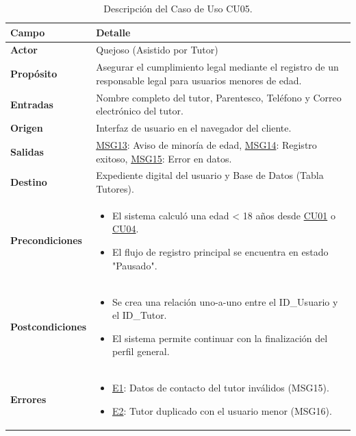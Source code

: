\begin{appendices}
\begin{table}[htbp]
\centering
\small
\begin{tabular}{|p{3.5cm}|p{10.5cm}|}
\hline
\rowcolor[HTML]{EFEFEF} 
\textbf{Campo} & \textbf{Detalle} \\ \hline
\textbf{Actor} & Quejoso (Asistido por Tutor) \\ \hline
\textbf{Propósito} & Asegurar el cumplimiento legal mediante el registro de un responsable legal para usuarios menores de edad. \\ \hline
\textbf{Entradas} & Nombre completo del tutor, Parentesco, Teléfono y Correo electrónico del tutor. \\ \hline
\textbf{Origen} & Interfaz de usuario en el navegador del cliente. \\ \hline
\textbf{Salidas} & \hyperlink{msg:MSG13}{MSG13}: Aviso de minoría de edad, \hyperlink{msg:MSG14}{MSG14}: Registro exitoso, \hyperlink{msg:MSG15}{MSG15}: Error en datos. \\ \hline
\textbf{Destino} & Expediente digital del usuario y Base de Datos (Tabla Tutores). \\ \hline
\textbf{Precondiciones} & 
\begin{itemize}[nosep, leftmargin=*]
    \item El sistema calculó una edad < 18 años desde \hyperlink{anexo:casos_uso}{CU01} o \hyperlink{anexo:casos_uso}{CU04}.
    \item El flujo de registro principal se encuentra en estado "Pausado".
\end{itemize} \\ \hline
\textbf{Postcondiciones} & 
\begin{itemize}[nosep, leftmargin=*]
    \item Se crea una relación uno-a-uno entre el ID\_Usuario y el ID\_Tutor.
    \item El sistema permite continuar con la finalización del perfil general.
\end{itemize} \\ \hline
\textbf{Errores} & 
\begin{itemize}[nosep, leftmargin=*]
    \item \hyperlink{err:E8}{E1}: Datos de contacto del tutor inválidos (MSG15).
    \item \hyperlink{err:E9}{E2}: Tutor duplicado con el usuario menor (MSG16).
\end{itemize} \\ \hline
\end{tabular}
\caption{Descripción del Caso de Uso CU05.}
\label{tab:cu05_especificacion}
\end{table}


\end{appendices}
